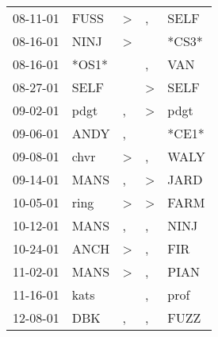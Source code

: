 \begin{supertabular}{p{0.07\textwidth}p{0.06\textwidth}p{0.02\textwidth}p{0.02\textwidth}p{0.06\textwidth}}
 08-11-01\textsuperscript{} &           FUSS\textsuperscript{} &     \textgreater &             , &           SELF\textsuperscript{} \\
 08-16-01\textsuperscript{} &           NINJ\textsuperscript{} &     \textgreater &               &                            *CS3* \\
 08-16-01\textsuperscript{} &                            *OS1* &                  &             , &            VAN\textsuperscript{} \\
 08-27-01\textsuperscript{} &           SELF\textsuperscript{} &                  &  \textgreater &           SELF\textsuperscript{} \\
 09-02-01\textsuperscript{} &           pdgt\textsuperscript{} &                , &  \textgreater &           pdgt\textsuperscript{} \\
 09-06-01\textsuperscript{} &           ANDY\textsuperscript{} &                , &               &                            *CE1* \\
 09-08-01\textsuperscript{} &           chvr\textsuperscript{} &     \textgreater &             , &           WALY\textsuperscript{} \\
 09-14-01\textsuperscript{} &           MANS\textsuperscript{} &                , &  \textgreater &           JARD\textsuperscript{} \\
 10-05-01\textsuperscript{} &           ring\textsuperscript{} &     \textgreater &  \textgreater &           FARM\textsuperscript{} \\
 10-12-01\textsuperscript{} &           MANS\textsuperscript{} &                , &             , &           NINJ\textsuperscript{} \\
 10-24-01\textsuperscript{} &           ANCH\textsuperscript{} &     \textgreater &             , &            FIR\textsuperscript{} \\
 11-02-01\textsuperscript{} &           MANS\textsuperscript{} &     \textgreater &             , &           PIAN\textsuperscript{} \\
 11-16-01\textsuperscript{} &           kats\textsuperscript{} &                  &             , &           prof\textsuperscript{} \\
 12-08-01\textsuperscript{} &            DBK\textsuperscript{} &                , &             , &           FUZZ\textsuperscript{} \\

\end{supertabular}
